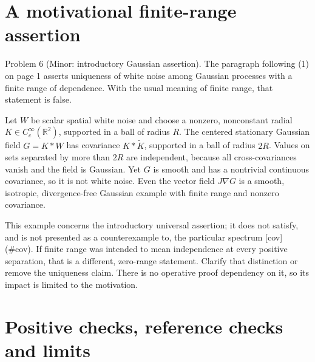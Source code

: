 \documentclass[10pt]{article}
\begin{document}
\section*{A motivational finite-range assertion}
Problem 6 (Minor: introductory Gaussian assertion).  The paragraph following (1) on page 1 asserts uniqueness of white noise among Gaussian processes with a finite range of dependence. With the usual meaning of finite range, that statement is false.\par
Let \(W\) be scalar spatial white noise and choose a nonzero, nonconstant radial \(K\in C_c^\infty(\mathbb R^2)\), supported in a ball of radius \(R\). The centered stationary Gaussian field \(G=K*W\) has covariance \(K*\widetilde K\), supported in a ball of radius \(2R\). Values on sets separated by more than \(2R\) are independent, because all cross-covariances vanish and the field is Gaussian. Yet \(G\) is smooth and has a nontrivial continuous covariance, so it is not white noise. Even the vector field \(J\nabla G\) is a smooth, isotropic, divergence-free Gaussian example with finite range and nonzero covariance.\par
This example concerns the introductory universal assertion; it does not satisfy, and is not presented as a counterexample to, the particular spectrum [cov] (\#cov). If finite range was intended to mean independence at every positive separation, that is a different, zero-range statement. Clarify that distinction or remove the uniqueness claim. There is no operative proof dependency on it, so its impact is limited to the motivation.\par
\section*{Positive checks, reference checks and limits}
\end{document}
